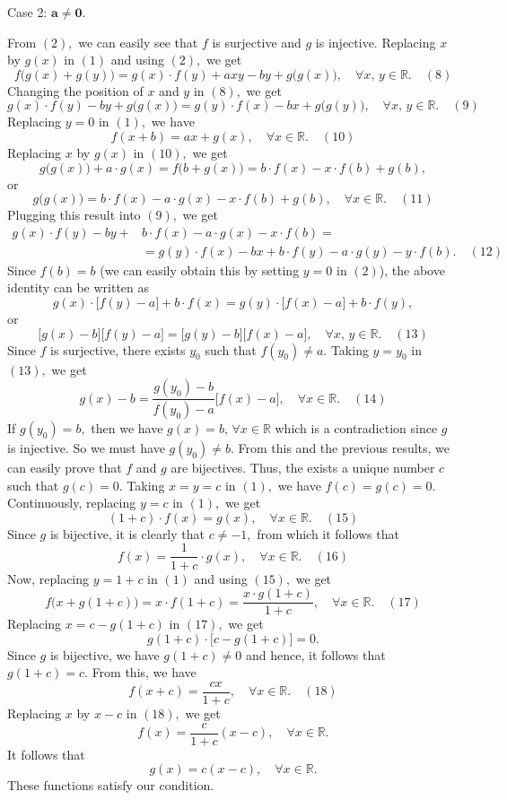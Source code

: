 \begin{mysolution}
\begin{bolded}Case 2: $\mathbf{a \ne 0.}$\end{bolded} From $(2),$ we can easily see that $f$ is surjective and $g$ is injective. Replacing $x$ by $g(x)$ in $(1)$ and using $(2),$ we get \[f\big(g(x)+g(y)\big)=g(x)\cdot f(y)+axy-by+g\big(g(x)\big),\quad \forall x ,\,y \in \mathbb R. \quad (8)\] Changing the position of $x$ and $y$ in $(8),$ we get \[g(x)\cdot f(y)-by+g\big(g(x)\big)=g(y)\cdot f(x)-bx+g\big(g(y)\big),\quad \forall x,\,y \in \mathbb R. \quad (9)\] Replacing $y=0$ in $(1),$ we have \[f(x+b)=ax+g(x),\quad \forall x \in \mathbb R. \quad (10)\] Replacing $x$ by $g(x)$ in $(10),$ we get \[g\big(g(x)\big)+a\cdot g(x)=f\big(b+g(x)\big)=b\cdot f(x)-x\cdot f(b)+g(b),\] or \[g\big(g(x)\big)=b\cdot f(x)-a\cdot g(x)-x\cdot f(b)+g(b),\quad \forall x \in \mathbb R. \quad (11)\] Plugging this result into $(9),$ we get \[\begin{aligned} g(x)\cdot f(y)-by+{}&b\cdot f(x)-a\cdot g(x)-x\cdot f(b)=\\ &=g(y)\cdot f(x)-bx+b\cdot f(y)-a\cdot g(y)-y\cdot f(b).\quad (12)\end{aligned}\] Since $f(b)=b$ (we can easily obtain this by setting $y=0$ in $(2)$), the above identity can be written as \[g(x)\cdot \big[ f(y)-a\big] +b\cdot f(x)=g(y)\cdot \big[ f(x)-a\big] +b\cdot f(y),\] or \[\big[ g(x)-b\big] \big[ f(y)-a\big]=\big[ g(y)-b\big] \big[ f(x)-a\big],\quad \forall x,\,y \in \mathbb R. \quad (13)\] Since $f$ is surjective, there exists $y_0$ such that $f(y_0) \ne a.$ Taking $y=y_0$ in $(13),$ we get \[g(x)-b=\frac{g(y_0)-b}{f(y_0)-a}\big[f(x)-a\big],\quad \forall x \in \mathbb R.  \quad (14)\] If $g(y_0)=b,$ then we have $g(x)=b,\,\forall x \in \mathbb R$ which is a contradiction since $g$ is injective. So we must have $g(y_0)\ne b.$   From this and the previous results, we can easily prove that $f$ and $g$ are bijectives. Thus, the exists a unique number $c$ such that $g(c)=0.$ Taking $x=y=c$ in $(1),$ we have $f(c)=g(c)=0.$ Continuously, replacing $y=c$ in $(1),$ we get \[(1+c)\cdot f(x)=g(x),\quad \forall x \in \mathbb R. \quad (15)\] Since $g$ is bijective, it is clearly that $c \ne -1,$ from which it follows that \[f(x)=\frac{1}{1+c}\cdot g(x),\quad \forall x \in \mathbb R. \quad (16)\] Now, replacing $y=1+c$ in $(1)$ and using $(15),$ we get \[f\big(x+g(1+c)\big)=x\cdot f(1+c)=\frac{x\cdot g(1+c)}{1+c},\quad \forall x \in \mathbb R. \quad (17)\] Replacing $x=c-g(1+c)$ in $(17),$ we get \[g(1+c)\cdot \big[c-g(1+c)\big]=0.\] Since $g$ is bijective, we have $g(1+c)\ne 0$ and hence, it follows that $g(1+c)=c.$ From this, we have \[f(x+c)=\frac{cx}{1+c},\quad \forall x \in \mathbb R.\quad (18)\] Replacing $x$ by $x-c$ in $(18),$ we get \[f(x)=\frac{c}{1+c}(x-c),\quad \forall x \in \mathbb R.\] It follows that \[g(x)=c(x-c),\quad \forall x \in \mathbb R.\] These functions satisfy our condition.
\end{mysolution}




